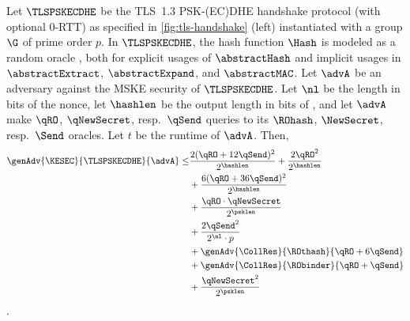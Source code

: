 \begin{theorem}\label{thm:main}
	Let $\TLSPSKECDHE$ be the TLS~1.3 PSK-(EC)DHE handshake protocol (with optional 0-RTT) as specified in \autoref{fig:tls-handshake} (left) instantiated with a group $\G$ of prime order $p$.
	In $\TLSPSKECDHE$, the hash function $\Hash$ is modeled as a random oracle \replace{$\ROhash$}{$\RO$}, both for explicit usages of $\abstractHash$ and implicit usages in $\abstractExtract$, $\abstractExpand$, and $\abstractMAC$.
	Let $\advA$ be an adversary against the MSKE security of $\TLSPSKECDHE$.
	Let $\nl$ be the length in bits of the nonce, let $\hashlen$ be the output length in bits of \replace{$\ROhash$}{$\RO$}, and let $\advA$ make $\qRO$, $\qNewSecret$, resp.\ $\qSend$ queries to its $\ROhash$, $\NewSecret$, resp.\ $\Send$ oracles.
	Let $t$ be the runtime of $\advA$. 
	Then,
	\begin{align*}
		\genAdv{\KESEC}{\TLSPSKECDHE}{\advA} \leq& \frac{2(\qRO+12\qSend)^2}{2^{\hashlen}} + \frac{2\qRO^2}{2^{\hashlen}}\\
		& + \frac{6(\qRO+36\qSend)^2}{2^{\hashlen}}\\
		& + \frac{\qRO \cdot \qNewSecret}{2^\psklen}\\
		& +\frac{2\qSend^2}{2^{\nl} \cdot p} \\
		& + \genAdv{\CollRes}{\ROthash}{\qRO+6\qSend} \\
		& +  \genAdv{\CollRes}{\RObinder}{\qRO+\qSend}\\
		& + \frac{\qNewSecret^2}{2^\psklen}\\
	\end{align*}
	.
\end{theorem}

